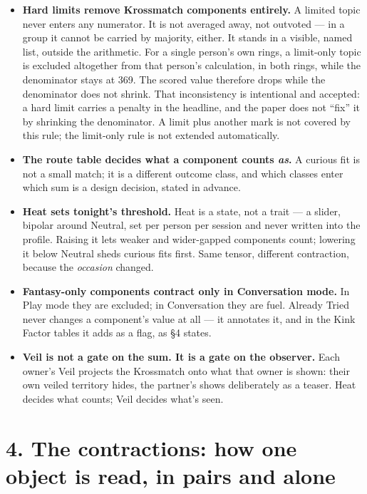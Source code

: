 \begin{itemize}
\tightlist
\item
  \textbf{Hard limits remove Krossmatch components entirely.} A limited
  topic never enters any numerator. It is not averaged away, not
  outvoted --- in a group it cannot be carried by majority, either. It
  stands in a visible, named list, outside the arithmetic. For a single
  person's own rings, a limit-only topic is excluded altogether from
  that person's calculation, in both rings, while the denominator stays
  at 369. The scored value therefore drops while the denominator does
  not shrink. That inconsistency is intentional and accepted: a hard
  limit carries a penalty in the headline, and the paper does not
  ``fix'' it by shrinking the denominator. A limit plus another mark is
  not covered by this rule; the limit-only rule is not extended
  automatically.
\item
  \textbf{The route table decides what a component counts \emph{as}.} A
  curious fit is not a small match; it is a different outcome class, and
  which classes enter which sum is a design decision, stated in advance.
\item
  \textbf{Heat sets tonight's threshold.} Heat is a state, not a trait
  --- a slider, bipolar around Neutral, set per person per session and
  never written into the profile. Raising it lets weaker and
  wider-gapped components count; lowering it below Neutral sheds curious
  fits first. Same tensor, different contraction, because the
  \emph{occasion} changed.
\item
  \textbf{Fantasy-only components contract only in Conversation mode.}
  In Play mode they are excluded; in Conversation they are fuel. Already
  Tried never changes a component's value at all --- it annotates it,
  and in the Kink Factor tables it adds as a flag, as \S 4 states.
\item
  \textbf{Veil is not a gate on the sum. It is a gate on the observer.}
  Each owner's Veil projects the Krossmatch onto what that owner is
  shown: their own veiled territory hides, the partner's shows
  deliberately as a teaser. Heat decides what counts; Veil decides
  what's seen.
\end{itemize}

\section{4. The contractions: how one object is read, in pairs and
alone}\label{the-contractions-how-one-object-is-read-in-pairs-and-alone}

